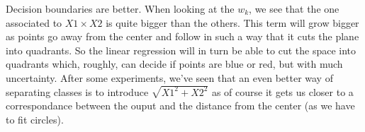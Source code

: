 \documentclass{article}
\begin{document}
Decision boundaries are better.
When looking at the $w_k$, we see that the one associated to $X1 \times X2$ is quite bigger than the others. This term will grow bigger as points go away from the center and follow in such a way that it cuts the plane into quadrants. So the linear regression will in turn be able to cut the space into quadrants which, roughly, can decide if points are blue or red, but with much uncertainty. After some experiments, we've seen that an even better way of separating classes is to introduce $\sqrt{X1 ^ 2 + X2 ^ 2}$ as of course it gets us closer to a correspondance between the ouput and the distance from the center (as we have to fit circles).

\end{document}
